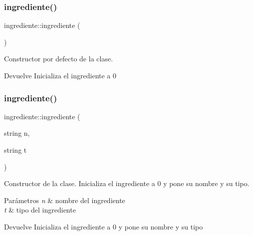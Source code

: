 \subsubsection{\texorpdfstring{ingrediente()}{ingrediente()}\hspace{0.1cm}{\footnotesize\ttfamily [1/3]}}
{\footnotesize\ttfamily ingrediente\+::ingrediente (\begin{DoxyParamCaption}{ }\end{DoxyParamCaption})}



Constructor por defecto de la clase. 

\begin{DoxyReturn}{Devuelve}
Inicializa el ingrediente a 0 
\end{DoxyReturn}
\mbox{\label{classingrediente_ac23e8df5d6df594b77de60b303e74652}} 
\subsubsection{\texorpdfstring{ingrediente()}{ingrediente()}\hspace{0.1cm}{\footnotesize\ttfamily [2/3]}}
{\footnotesize\ttfamily ingrediente\+::ingrediente (\begin{DoxyParamCaption}\item[{string}]{n,  }\item[{string}]{t }\end{DoxyParamCaption})}



Constructor de la clase. Inicializa el ingrediente a 0 y pone su nombre y su tipo. 


\begin{DoxyParams}{Parámetros}
{\em n} & nombre del ingrediente \\
\hline
{\em t} & tipo del ingrediente \\
\hline
\end{DoxyParams}
\begin{DoxyReturn}{Devuelve}
Inicializa el ingrediente a 0 y pone su nombre y su tipo 
\end{DoxyReturn}
\mbox{\label{classingrediente_a6952df43dea2eced53c3f2ce2126a39d}} 
